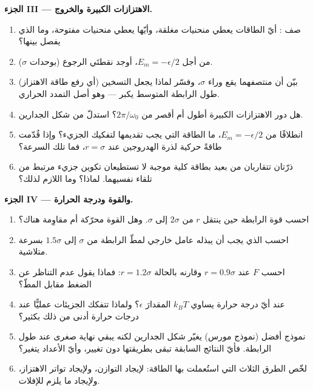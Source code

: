 \begin{problem}
\medskip
\noindent\textbf{الجزء III --- الاهتزازات الكبيرة والخروج.}
\begin{enumerate}[resume]
  \item صف : أيّ الطاقات يعطي منحنيات مغلقة،
        وأيّها يعطي منحنيات مفتوحة، وما الذي يفصل بينها؟
  \item من أجل $E_m = -\epsilon/2$، أوجد نقطتَي الرجوع (بوحدات
        $\sigma$).
  \item بيّن أن منتصفهما يقع وراء $\sigma$، وفسّر لماذا يجعل
        التسخين (أي رفع طاقة الاهتزاز) طول الرابطة المتوسط يكبر
        --- وهو أصل التمدد الحراري.
  \item هل دور الاهتزازات الكبيرة أطول أم أقصر من
        $2\pi/\omega_0$؟ استدلّ من شكل الجدارين.
  \item انطلاقًا من $E_m = -\epsilon/2$، ما الطاقة التي يجب تقديمها
        لتفكيك الجزيء؟ وإذا قُدّمت طاقةً حركية لذرة
        الهدروجين عند $r = \sigma$، فما تلك السرعة؟
  \item ذرّتان تتقاربان من بعيد بطاقة كلية موجبة لا تستطيعان
        تكوين جزيء مرتبط من تلقاء نفسيهما. لماذا؟ وما اللازم لذلك؟
\end{enumerate}

\medskip
\noindent\textbf{الجزء IV ---  والقوة ودرجة الحرارة.}
\begin{enumerate}[resume]
  \item احسب  قوة الرابطة حين ينتقل $r$ من $2\sigma$
        إلى $\sigma$. وهل القوة محرّكة أم مقاوِمة هناك؟
  \item احسب  الذي يجب أن يبذله عامل خارجي لمطّ الرابطة
        من $\sigma$ إلى $1.5\sigma$ بسرعة متلاشية.
  \item احسب $F$ عند $r = 0.9\sigma$ وقارنه بالحالة $r = 1.2\sigma$:
        فماذا يقول عدم التناظر عن الضغط مقابل المطّ؟
  \item عند أيّ درجة حرارة يساوي $k_BT$ المقدارَ $\epsilon$؟ ولماذا
        تتفكك الجزيئات عمليًّا عند درجات حرارة أدنى من ذلك بكثير؟
  \item نموذج أفضل (نموذج مورس) يغيّر شكل الجدارين لكنه يبقي
        نهاية صغرى عند طول الرابطة. فأيّ النتائج السابقة تبقى
        بطريقتها دون تغيير، وأيّ الأعداد يتغير؟
  \item لخّص الطرق الثلاث التي استُعملت بها الطاقة: لإيجاد
        التوازن، ولإيجاد تواتر الاهتزاز، ولإيجاد ما
        يلزم للإفلات.
\end{enumerate}
\end{problem}
